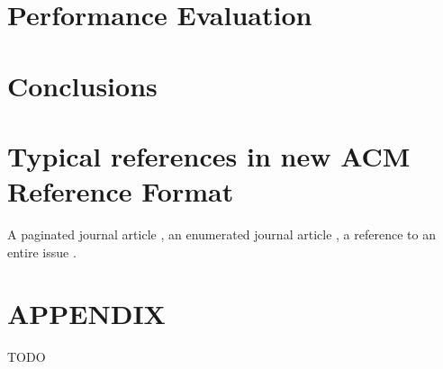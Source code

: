 \documentclass[prodmode,acmtecs]{acmsmall} %
\begin{document}
\section{Performance Evaluation}

\section{Conclusions}



\section{Typical references in new ACM Reference Format}
A paginated journal article \cite{Abril07}, an enumerated
journal article \cite{Cohen07}, a reference to an entire issue \cite{JCohen96}.

\appendix
\section*{APPENDIX}
\setcounter{section}{1}
TODO





\medskip
\end{document}
